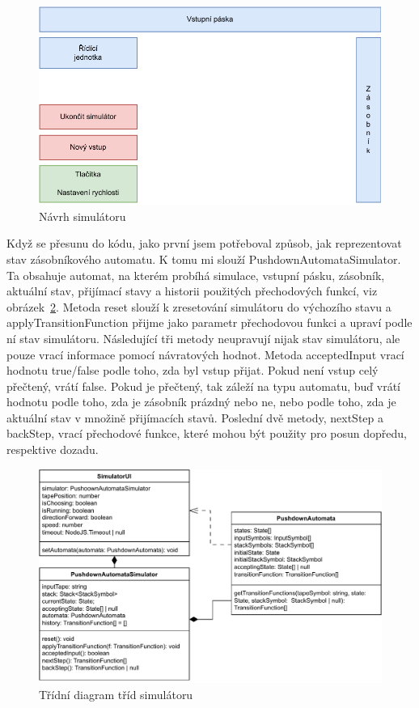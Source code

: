 \begin{figure}[h]
    \centering
    \includegraphics{Figures/SimulatoPageDesign.drawio.pdf}
    \caption{Návrh simulátoru}\label{fig:SimulatorPageDesign}
\end{figure}

Když se přesunu do kódu, jako první jsem potřeboval způsob, jak reprezentovat stav zásobníkového automatu. K tomu mi slouží PushdownAutomataSimulator. Ta obsahuje automat, na kterém probíhá simulace, vstupní pásku, zásobník, aktuální stav, přijímací stavy a historii použitých přechodových funkcí, viz obrázek~\ref{fig:SimulatorClasses}. Metoda reset slouží k zresetování simulátoru do výchozího stavu a applyTransitionFunction přijme jako parametr přechodovou funkci a upraví podle ní stav simulátoru. Následující tři metody neupravují nijak stav simulátoru, ale pouze vrací informace pomocí návratových hodnot. Metoda acceptedInput vrací hodnotu true/false podle toho, zda byl vstup přijat. Pokud není vstup celý přečtený, vrátí false. Pokud je přečtený, tak záleží na typu automatu, buď vrátí hodnotu podle toho, zda je zásobník prázdný nebo ne, nebo podle toho, zda je aktuální stav v množině přijímacích stavů.
Poslední dvě metody, nextStep a backStep, vrací přechodové funkce, které mohou být použity pro posun dopředu, respektive dozadu.

\begin{figure}[h]
    \centering
    \includegraphics[width=\textwidth]{Figures/SimulatorClasses.drawio.pdf}
    \caption{Třídní diagram tříd simulátoru}\label{fig:SimulatorClasses}
\end{figure}

